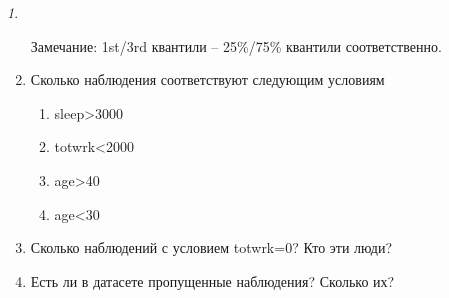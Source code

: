 \documentclass[12pt]{article}
\theoremstyle{remark}
\newtheorem{exercise}{}[section]
\begin{document}
\begin{exercise}
\begin{enumerate}
	Замечание: 1st/3rd квантили -- 25\%/75\% квантили соответственно.
	\item Сколько наблюдения соответствуют следующим условиям
	\begin{enumerate}
		\item sleep>3000
		\item totwrk<2000
		\item age>40
		\item age<30
	\end{enumerate}
	\item Сколько наблюдений с условием totwrk=0? 
	Кто эти люди?
	\item Есть ли в датасете пропущенные наблюдения?
	Сколько их?
\end{enumerate}
\end{exercise}
\end{document}
